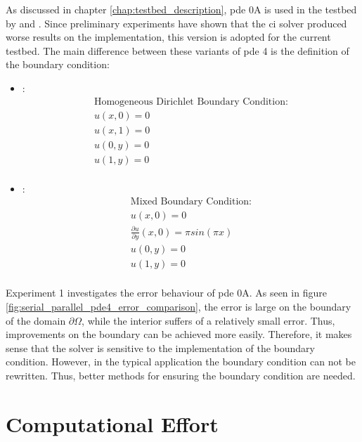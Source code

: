 \documentclass[./\jobname.tex]{subfiles}
\begin{document}
As discussed in chapter \ref{chap:testbed_description}, \gls{pde} 0A is used in the testbed by \cite{chaquet_using_2019} and \cite{mitchell_nist_2018}. Since preliminary experiments have shown that the \gls{ci} solver produced worse results on the \cite{mitchell_nist_2018} implementation, this version is adopted for the current testbed. The main difference between these variants of \gls{pde} 4 is the definition of the boundary condition: 

\begin{itemize}
	\item \underline{\textbf{\cite{mitchell_nist_2018}}}: 
	\begin{equation*}
		\begin{split}
		\text{Homogeneous Dirichlet Boundary Condition:} \\
		u(x,0) = 0 \\
		u(x,1) = 0 \\
		u(0,y) = 0 \\
		u(1,y) = 0 \\
		\end{split}
	\end{equation*}
	\item \underline{\textbf{\cite{chaquet_using_2019}}}:
	\begin{equation*}
		\begin{split}
		\text{Mixed Boundary Condition:} \\
		u(x,0) = 0 \\
		\frac{\partial u}{\partial y} (x,0) = \pi sin(\pi x) \\
		u(0,y) = 0 \\
		u(1,y) = 0 \\
		\end{split}
	\end{equation*}
\end{itemize}

Experiment 1 investigates the error behaviour of \gls{pde} 0A. As seen in figure \ref{fig:serial_parallel_pde4_error_comparison}, the error is large on the boundary of the domain $\partial \Omega$, while the interior suffers of a relatively small error. Thus, improvements on the boundary can be achieved more easily. Therefore, it makes sense that the solver is sensitive to the implementation of the boundary condition. However, in the typical application the boundary condition can not be rewritten. Thus, better methods for ensuring the boundary condition are needed. 


\section{Computational Effort}
\label{chap:computational_effort}
\end{document}
